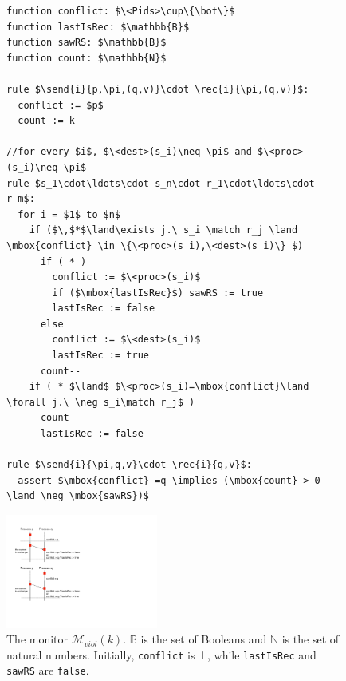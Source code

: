 \begin{figure}[t]
\begin{minipage}{6.5cm}
\begin{lstlisting}
function conflict: $\<Pids>\cup\{\bot\}$
function lastIsRec: $\mathbb{B}$
function sawRS: $\mathbb{B}$
function count: $\mathbb{N}$

rule $\send{i}{p,\pi,(q,v)}\cdot \rec{i}{\pi,(q,v)}$:
  conflict := $p$
  count := k

//for every $i$, $\<dest>(s_i)\neq \pi$ and $\<proc>(s_i)\neq \pi$
rule $s_1\cdot\ldots\cdot s_n\cdot r_1\cdot\ldots\cdot r_m$:
  for i = $1$ to $n$
    if ($\,$*$\land\exists j.\ s_i \match r_j \land \mbox{conflict} \in \{\<proc>(s_i),\<dest>(s_i)\} $)
      if ( * )
        conflict := $\<proc>(s_i)$
        if ($\mbox{lastIsRec}$) sawRS := true
        lastIsRec := false
      else 
        conflict := $\<dest>(s_i)$
        lastIsRec := true
      count--
    if ( * $\land$ $\<proc>(s_i)=\mbox{conflict}\land \forall j.\ \neg s_i\match r_j$ )
      count--
      lastIsRec := false

rule $\send{i}{\pi,q,v}\cdot \rec{i}{q,v}$:
  assert $\mbox{conflict} =q \implies (\mbox{count} > 0 \land \neg \mbox{sawRS})$
\end{lstlisting}
\end{minipage}
\hspace{5mm}
\begin{minipage}{5.5cm}
\includegraphics[width=5cm]{Borderline-mviol.pdf}
\end{minipage}
\vspace{-3mm}
\caption{The monitor $\mathcal{M}_{\mathit{viol}}(k)$. $\mathbb{B}$ is the set of Booleans and $\mathbb{N}$ is the set of natural numbers. Initially, {\tt conflict} is $\bot$, while {\tt lastIsRec} and {\tt sawRS} are {\tt false}.}
\label{fig:mon_viol}
\vspace{-5mm}
\end{figure}

